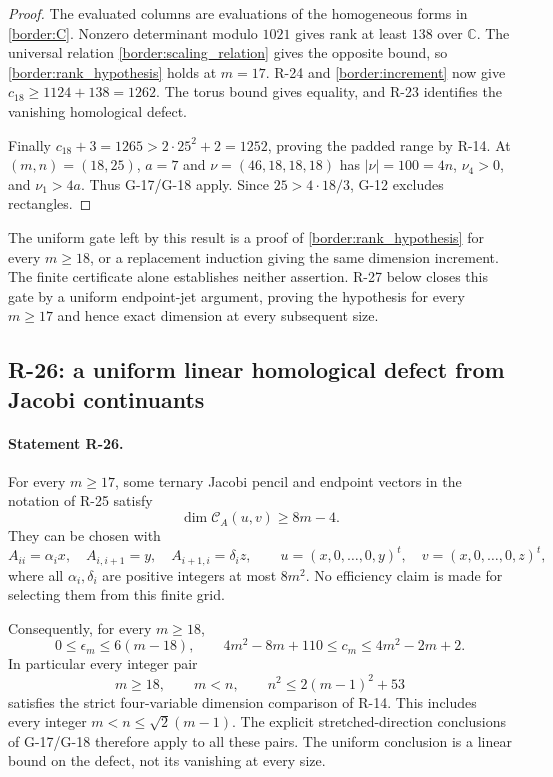 \begin{proof}
The evaluated columns are evaluations of the homogeneous forms
in \eqref{border:C}. Nonzero determinant modulo $1021$ gives
rank at least $138$ over $\mathbb C$. The universal relation
\eqref{border:scaling_relation} gives the opposite bound, so
\eqref{border:rank_hypothesis} holds at $m=17$.
R-24 and \eqref{border:increment} now give
$c_{18}\geq1124+138=1262$. The torus bound gives equality, and
R-23 identifies the vanishing homological defect.

Finally $c_{18}+3=1265>2\cdot25^2+2=1252$, proving the padded
range by R-14. At $(m,n)=(18,25)$, $a=7$ and
$\nu=(46,18,18,18)$ has $|\nu|=100=4n$, $\nu_4>0$, and
$\nu_1>4a$. Thus G-17/G-18 apply. Since $25>4\cdot18/3$,
G-12 excludes rectangles.
\end{proof}

The uniform gate left by this result is a proof of
\eqref{border:rank_hypothesis} for every $m\geq18$, or a
replacement induction giving the same dimension increment.
The finite certificate alone establishes neither assertion.
R-27 below closes this gate by a uniform endpoint-jet argument,
proving the hypothesis for every $m\geq17$ and hence exact
dimension at every subsequent size.

\subsection{R-26: a uniform linear homological defect from Jacobi continuants}

\paragraph{Statement R-26.}
For every $m\geq17$, some ternary Jacobi pencil and endpoint vectors
in the notation of R-25 satisfy
\begin{equation}\label{R26:criterion}
 \dim\mathcal C_A(u,v)\geq8m-4.
\end{equation}
They can be chosen with
\[
 A_{ii}=\alpha_i x,\quad A_{i,i+1}=y,\quad
 A_{i+1,i}=\delta_i z,\qquad
 u=(x,0,\ldots,0,y)^t,\quad v=(x,0,\ldots,0,z)^t,
\]
where all $\alpha_i,\delta_i$ are positive integers at most $8m^2$.
No efficiency claim is made for selecting them from this finite grid.

Consequently, for every $m\geq18$,
\begin{equation}\label{R26:linear_defect}
 0\leq\epsilon_m\leq6(m-18),\qquad
 4m^2-8m+110\leq c_m\leq4m^2-2m+2.
\end{equation}
In particular every integer pair
\begin{equation}\label{R26:padding}
 m\geq18,\qquad m<n,\qquad n^2\leq2(m-1)^2+53
\end{equation}
satisfies the strict four-variable dimension comparison of R-14.
This includes every integer $m<n\leq\sqrt2(m-1)$.
The explicit stretched-direction conclusions of G-17/G-18 therefore
apply to all these pairs. The uniform conclusion is a linear bound
on the defect, not its vanishing at every size.

